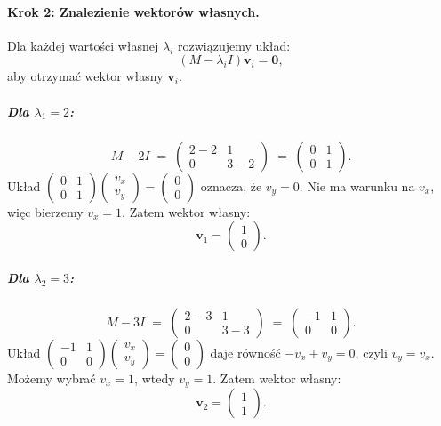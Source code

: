 \paragraph{Krok 2: Znalezienie wektorów własnych.}
Dla każdej wartości własnej \(\lambda_i\) rozwiązujemy układ:
\[
(M - \lambda_i I)\mathbf{v}_i = \mathbf{0},
\]
aby otrzymać wektor własny \(\mathbf{v}_i\).

\subparagraph{Dla \(\lambda_1 = 2\):}
\[
M - 2I 
\;=\;
\begin{pmatrix}
2-2 & 1 \\
0 & 3-2
\end{pmatrix}
\;=\;
\begin{pmatrix}
0 & 1 \\
0 & 1
\end{pmatrix}.
\]
Układ \(\begin{pmatrix}0 & 1\\0 & 1\end{pmatrix} \begin{pmatrix}v_x\\v_y\end{pmatrix} = \begin{pmatrix}0\\0\end{pmatrix}\)
oznacza, że \(v_y = 0\). Nie ma warunku na \(v_x\), więc bierzemy \(v_x = 1\). 
Zatem wektor własny:
\[
\mathbf{v}_1 = \begin{pmatrix} 1 \\ 0 \end{pmatrix}.
\]

\subparagraph{Dla \(\lambda_2 = 3\):}
\[
M - 3I 
\;=\;
\begin{pmatrix}
2-3 & 1 \\
0 & 3-3
\end{pmatrix}
\;=\;
\begin{pmatrix}
-1 & 1 \\
0  & 0
\end{pmatrix}.
\]
Układ \(\begin{pmatrix}-1 & 1\\0 & 0\end{pmatrix}\begin{pmatrix}v_x\\v_y\end{pmatrix} = \begin{pmatrix}0\\0\end{pmatrix}\)
daje równość \(-v_x + v_y = 0\), czyli \(v_y = v_x\). Możemy wybrać \(v_x = 1\), wtedy \(v_y = 1\).
Zatem wektor własny:
\[
\mathbf{v}_2 = \begin{pmatrix} 1 \\ 1 \end{pmatrix}.
\]

